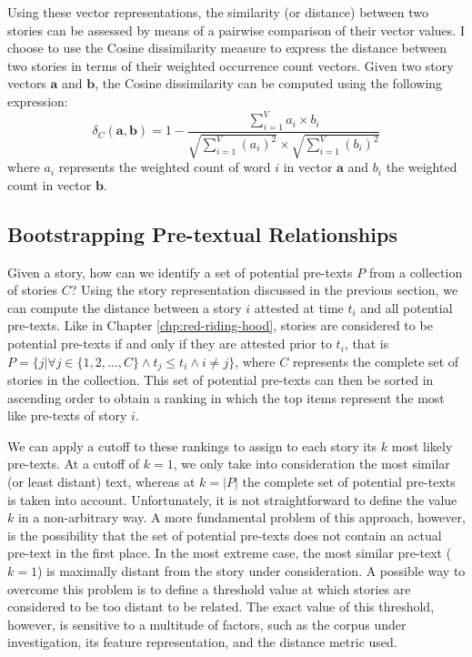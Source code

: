 Using these vector representations, the similarity (or distance) between two stories can be assessed by means of a pairwise comparison of their vector values. I choose to use the Cosine dissimilarity measure to express the distance between two stories in terms of their weighted occurrence count vectors. Given two story vectors $\mathbf{a}$ and $\mathbf{b}$, the Cosine dissimilarity can be computed using the following expression:
\begin{equation}
\delta_C(\mathbf{a}, \mathbf{b}) = 1 - \frac{\sum^V_{i=1} a_i \times b_i}{\sqrt{\sum^V_{i=1} (a_i)^2} \times \sqrt{\sum^V_{i=1} (b_i)^2}}
\end{equation}
where $a_i$ represents the weighted count of word $i$ in vector $\mathbf{a}$ and $b_i$ the weighted count in vector $\mathbf{b}$.


\subsection{Bootstrapping Pre-textual Relationships}\label{sec:bootstrapping-networks}

Given a story, how can we identify a set of potential pre-texts $P$ from a collection of stories $C$? Using the story representation discussed in the previous section, we can compute the distance between a story $i$ attested at time $t_i$ and all potential pre-texts. Like in Chapter \ref{chp:red-riding-hood}, stories are considered to be potential pre-texts if and only if they are attested prior to $t_i$, that is $P = \{j | \forall j \in \{1, 2, \ldots, C\} \wedge t_j \leq t_i \wedge i \neq j\}$, where $C$ represents the complete set of stories in the collection. This set of potential pre-texts can then be sorted in ascending order to obtain a ranking in which the top items represent the most like pre-texts of story $i$. 

We can apply a cutoff to these rankings to assign to each story its $k$ most likely pre-texts. At a cutoff of $k=1$, we only take into consideration the most similar (or least distant) text, whereas at $k=|P|$ the complete set of potential pre-texts is taken into account. Unfortunately, it is not straightforward to define the value $k$ in a non-arbitrary way. A more fundamental problem of this approach, however, is the possibility that the set of potential pre-texts does not contain an actual pre-text in the first place. In the most extreme case, the most similar pre-text ($k=1$) is maximally distant from the story under consideration. A possible way to overcome this problem is to define a threshold value at which stories are considered to be too distant to be related. The exact value of this threshold, however, is sensitive to a multitude of factors, such as the corpus under investigation, its feature representation, and the distance metric used. 

